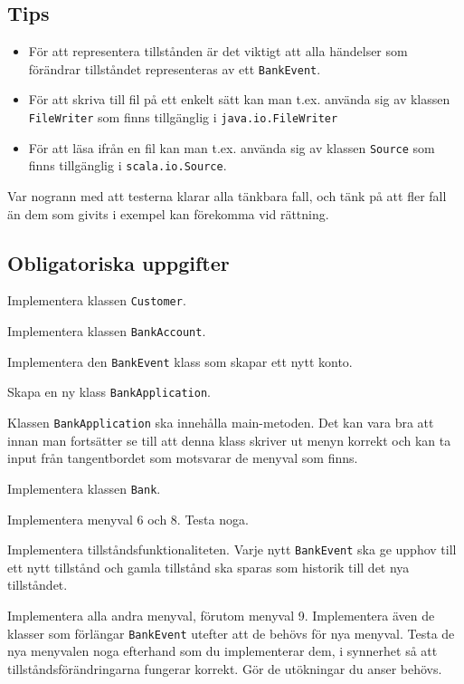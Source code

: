 \subsection{Tips} 

\begin{itemize}
\item För att representera tillstånden är det viktigt att alla händelser som förändrar tillståndet representeras av ett \texttt{BankEvent}.

\item För att skriva till fil på ett enkelt sätt kan man t.ex. använda sig av klassen \texttt{FileWriter} som finns tillgänglig i \texttt{java.io.FileWriter}

\item För att läsa ifrån en fil kan man t.ex. använda sig av klassen \texttt{Source} som finns tillgänglig i \texttt{scala.io.Source}. 
\end{itemize}

\item Var nogrann med att testerna klarar alla tänkbara fall, och tänk på att fler fall än dem som givits i exempel kan förekomma vid rättning.

\subsection{Obligatoriska uppgifter}

\Task Implementera klassen \texttt{Customer}.

\Task Implementera klassen \texttt{BankAccount}.

\Task Implementera den \texttt{BankEvent} klass som skapar ett nytt konto.

\Task Skapa en ny klass \texttt{BankApplication}.

\Subtask Klassen \texttt{BankApplication} ska innehålla main-metoden. Det kan vara bra att innan man fortsätter se till att denna klass skriver ut menyn korrekt och kan ta input från tangentbordet som motsvarar de menyval som finns.

\Task Implementera klassen \texttt{Bank}.

\Subtask Implementera menyval 6 och 8. Testa noga.

\Subtask Implementera tillståndsfunktionaliteten. Varje nytt \texttt{BankEvent} ska ge upphov till ett nytt tillstånd och gamla tillstånd ska sparas som historik till det nya tillståndet.

\Subtask Implementera alla andra menyval, förutom menyval 9. Implementera även de klasser som förlängar \texttt{BankEvent} utefter att de behövs för nya menyval.
Testa de nya menyvalen noga efterhand som du implementerar dem, i synnerhet så att tillståndsförändringarna fungerar korrekt. Gör de utökningar du anser behövs. 

